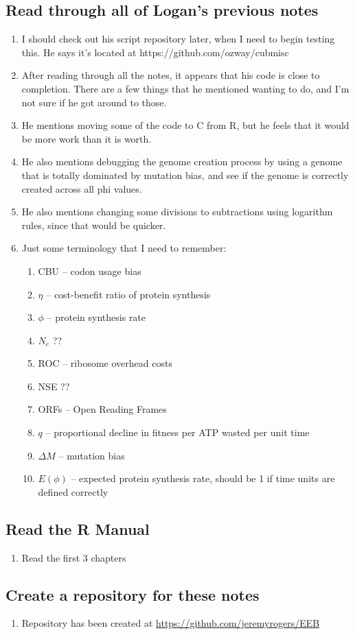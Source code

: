 \documentclass[12 pt]{article}
\begin{document}
	\subsection{Read through all of Logan's previous notes} 
		\begin{enumerate}
			\item I should check out his script repository later, when I need to begin testing this. He says it's located at https://github.com/ozway/cubmisc
			\item After reading through all the notes, it appears that his code is close to completion. There are a few things that he mentioned wanting to do, and I'm not sure if he got around to those.
			\item He mentions moving some of the code to C from R, but he feels that it would be more work than it is worth.
			\item He also mentions debugging the genome creation process by using a genome that is totally dominated by mutation bias, and see if the genome is correctly created across all phi values.
			\item He also mentions changing some divisions to subtractions using logarithm rules, since that would be quicker.
			
			\item Just some terminology that I need to remember:
			\begin{enumerate}
				\item CBU -- codon usage bias
				\item $ \eta $ -- cost-benefit ratio of protein synthesis
				\item $ \phi $ -- protein synthesis rate
				\item $ N_e $ ??
				\item ROC -- ribosome overhead costs
				\item NSE ??
				\item ORFs -- Open Reading Frames
				\item $ q $ -- proportional decline in fitness per ATP wasted per unit time
				\item $ \Delta M $ -- mutation bias
				\item $ E(\phi) $ -- expected protein synthesis rate, should be 1 if time units are defined correctly
				
			\end{enumerate} 
		\end{enumerate}
		
		\subsection{Read the R Manual}
		\begin{enumerate}
			\item Read the first 3 chapters
		\end{enumerate}
		
		\subsection{Create a repository for these notes}
			\begin{enumerate}
				\item Repository has been created at \url{https://github.com/jeremyrogers/EEB}
			\end{enumerate}
\end{document}
